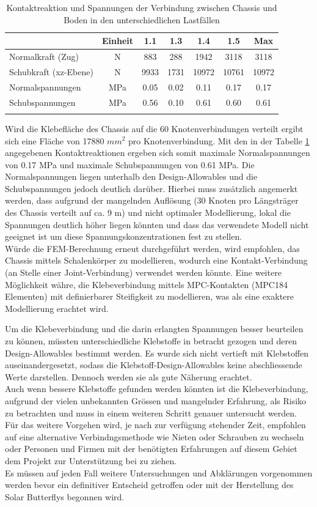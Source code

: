 \begin{table}[H]
\centering
\begin{tabular}{lcccccc}
\thickhline
	&	Einheit	&	1.1	&	1.3	&	1.4	&	1.5	&	Max	\\	\hline
Normalkraft (Zug)	&	N	&	883	&	288	&	1942	&	3118	&	3118	\\
Schubkraft (xz-Ebene)	&	N	&	9933	&	1731	&	10972	&	10761	&	10972	\\	\hline
Normalspannungen	&	MPa	&	0.05	&	0.02	&	0.11	&	0.17	&	0.17	\\
Schubspannungen	&	MPa	&	0.56	&	0.10	&	0.61	&	0.60	&	0.61	\\	\thickhline
\end{tabular}
\caption{Kontaktreaktion und Spannungen der Verbindung zwischen Chassis und Boden in den unterschiedlichen Lastfällen}
\label{tab:FEMres Boden}
\end{table}


Wird die Klebefläche des Chassis auf die 60 Knotenverbindungen verteilt ergibt sich eine Fläche von 17880 $mm^2$ pro Knotenverbindung. Mit den in der Tabelle \ref{tab:FEMres Boden} angegebenen Kontaktreaktionen ergeben sich somit maximale Normalspannungen von 0.17 MPa und maximale Schubspannungen von 0.61 MPa. Die Normalspannungen liegen unterhalb den Design-Allowables und die Schubspannungen jedoch deutlich darüber. Hierbei muss zusätzlich angemerkt werden, dass aufgrund der mangelnden Auflösung (30 Knoten pro Längsträger des Chassis verteilt auf ca. 9 m) und nicht optimaler Modellierung, lokal die Spannungen deutlich höher liegen könnten und dass das verwendete Modell nicht geeignet ist um diese Spannungskonzentrationen fest zu stellen.\\
Würde die FEM-Berechnung erneut durchgeführt werden, wird empfohlen, das Chassis mittels Schalenkörper zu modellieren, wodurch eine Kontakt-Verbindung (an Stelle einer Joint-Verbindung) verwendet werden könnte. Eine weitere Möglichkeit währe, die Klebeverbindung mittels MPC-Kontakten (MPC184 Elementen) mit definierbarer Steifigkeit zu modellieren, was als eine exaktere Modellierung erachtet wird.

Um die Klebeverbindung und die darin erlangten Spannungen besser beurteilen zu können, müssten unterschiedliche Klebstoffe in betracht gezogen und deren Design-Allowables bestimmt werden. Es wurde sich nicht vertieft mit Klebstoffen auseinandergesetzt, sodass die Klebstoff-Design-Allowables keine abschliessende Werte darstellen. Dennoch werden sie als gute Näherung erachtet.\\
Auch wenn bessere Klebstoffe gefunden werden könnten ist die Klebeverbindung, aufgrund der vielen unbekannten Grössen und mangelnder Erfahrung, als Risiko zu betrachten und muss in einem weiteren Schritt genauer untersucht werden. Für das weitere Vorgehen wird, je nach zur verfügung stehender Zeit, empfohlen auf eine alternative Verbindngsmethode wie Nieten oder Schrauben zu wechseln oder Personen und Firmen mit der benötigten Erfahrungen auf diesem Gebiet dem Projekt zur Unterstützung bei zu ziehen.\\
Es müssen auf jeden Fall weitere Untersuchungen und Abklärungen vorgenommen werden bevor ein definitiver Entscheid getroffen oder mit der Herstellung des Solar Butterflys begonnen wird.

